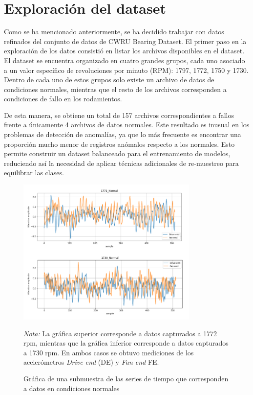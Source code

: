 \documentclass[11pt,a4paper,spanish]{book}
\numberwithin{equation}{chapter}
\numberwithin{figure}{chapter}
\begin{document}
\section{Exploración del dataset}

Como se ha mencionado anteriormente, se ha decidido trabajar con datos refinados del 
conjunto de datos de CWRU Bearing Dataset. El primer paso en la exploración de los datos
consistió en listar los archivos disponibles en el dataset. El dataset se encuentra 
organizado en cuatro grandes grupos, cada uno asociado a un valor específico de 
revoluciones por minuto (RPM): 1797, 1772, 1750 y 1730. Dentro de cada uno de estos 
grupos solo existe un archivo de datos de condiciones normales, mientras que el resto de
los archivos corresponden a condiciones de fallo en los rodamientos.


De esta manera, se obtiene un total de 157 archivos correspondientes a fallos frente a 
únicamente 4 archivos de datos normales. Este resultado es inusual en los problemas de 
detección de anomalías, ya que lo más frecuente es encontrar una proporción mucho menor 
de registros anómalos respecto a los normales. Esto permite construir un dataset 
balanceado para el entrenamiento de modelos, reduciendo así la necesidad de aplicar 
técnicas adicionales de re-muestreo para equilibrar las clases.


\begin{figure}[h]
	\caption{Gráfica de una submuestra de las series de tiempo que corresponden a datos 
    en condiciones normales}    
    \centering
    \includegraphics[width=0.8\textwidth]{media/dataset/normal-series.png}
    \label{fig:figNormalSeries}
    \parbox{\textwidth}{\footnotesize \textit{Nota:} La gráfica superior corresponde a
    datos capturados a 1772 rpm, mientras que la gráfica inferior corresponde a 
    datos capturados a 1730 rpm. En ambos casos se obtuvo mediciones de los acelerómetros
    \textit{Drive end} (DE) y \textit{Fan end} FE.}

\end{figure}
\end{document}
